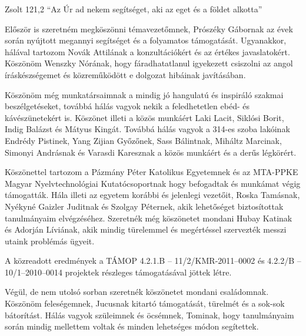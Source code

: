 \begin{chapquote}{Zsolt 121,2}
``Az Úr ad nekem segítséget, aki az eget és a földet alkotta''
\end{chapquote} 

Először is szeretném megköszönni témavezetőmnek, Prószéky Gábornak az évek során nyújtott megannyi segítséget és a folyamatos támogatását.
Ugyanakkor, hálával tartozom Novák Attilának a konzultációkért és az értékes javaslatokért.
Köszönöm Wenszky Nórának, hogy fáradhatatlanul igyekezett csiszolni az angol íráskészségemet és közreműködött e dolgozat hibáinak javításában.

Köszönöm még munkatársaimnak a mindig jó hangulatú és inspiráló szakmai beszélgetéseket, továbbá hálás vagyok nekik a feledhetetlen ebéd- és kávészünetekért is. 
Köszönet illeti a közös munkáért Laki Lacit, Siklósi Borit, Indig Balázst és Mátyus Kingát.
Továbbá hálás vagyok a 314-es szoba lakóinak Endrédy Pistinek, Yang Zijian Győzőnek, Sass Bálintnak, Miháltz Marcinak, Simonyi Andrásnak és Varasdi Karesznak a közös munkáért és a derűs légkörért.

Köszönettel tartozom a Pázmány Péter Katolikus Egyetemnek és az MTA-PPKE Magyar Nyelvtechnológiai Kutatócsoportnak hogy befogadtak és munkámat végig támogatták.
Hála illeti az egyetem korábbi és jelenlegi vezetőit, Roska Tamásnak, Nyékyné Gaizler Juditnak és Szolgay Péternek, akik lehetőséget biztosítottak tanulmányaim elvégzéséhez.
Szeretnék még köszönetet mondani Hubay Katinak és Adorján Líviának, akik mindig türelemmel és megértéssel szervezték messzi utaink problémás ügyeit.

A közreadott eredmények a TÁMOP 4.2.1.B -- 11/2/KMR-2011–0002 és 4.2.2/B -- 10/1–2010–0014 projektek részleges támogatásával jöttek létre.

Végül, de nem utolsó sorban szeretnék köszönetet mondani családomnak.
Köszönöm feleségemnek, Jucusnak kitartó támogatását, türelmét és a sok-sok bátorítást.
Hálás vagyok szüleimnek és öcsémnek, Tominak, hogy tanulmányaim során mindig mellettem voltak és minden lehetséges módon segítettek.


